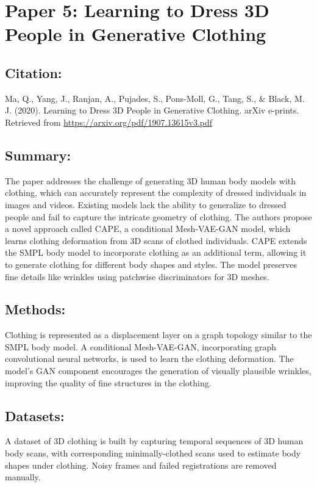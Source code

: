 \documentclass{article}
\begin{document}
\section*{Paper 5: Learning to Dress 3D People in Generative Clothing }

\subsection*{Citation:}
Ma, Q., Yang, J., Ranjan, A., Pujades, S., Pons-Moll, G., Tang, S., \& Black, M. J. (2020). Learning to Dress 3D People in Generative Clothing. arXiv e-prints. Retrieved from \url{https://arxiv.org/pdf/1907.13615v3.pdf}

\subsection*{Summary:}
The paper addresses the challenge of generating 3D human body models with clothing, which can accurately represent the complexity of dressed individuals in images and videos. Existing models lack the ability to generalize to dressed people and fail to capture the intricate geometry of clothing. The authors propose a novel approach called CAPE, a conditional Mesh-VAE-GAN model, which learns clothing deformation from 3D scans of clothed individuals. CAPE extends the SMPL body model to incorporate clothing as an additional term, allowing it to generate clothing for different body shapes and styles. The model preserves fine details like wrinkles using patchwise discriminators for 3D meshes.

\subsection*{Methods:}
Clothing is represented as a displacement layer on a graph topology similar to the SMPL body model. A conditional Mesh-VAE-GAN, incorporating graph convolutional neural networks, is used to learn the clothing deformation. The model's GAN component encourages the generation of visually plausible wrinkles, improving the quality of fine structures in the clothing.

\subsection*{Datasets:}
A dataset of 3D clothing is built by capturing temporal sequences of 3D human body scans, with corresponding minimally-clothed scans used to estimate body shapes under clothing. Noisy frames and failed registrations are removed manually.
\end{document}

